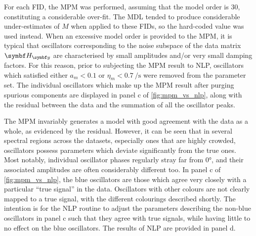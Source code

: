 For each \ac{FID}, the \ac{MPM} was performed, assuming that the model order is
30, constituting a considerable over-fit. The \ac{MDL} tended to produce
considerable under-estimates of $M$ when applied to these \acp{FID}, so the
hard-coded value was used instead. When an excessive model order is provided to
the \ac{MPM}, it is typical that oscillators corresponding to the noise
subspace of the data matrix $\Hy$ are characterised by small amplitudes and/or
very small damping factors. For this reason, prior to subjecting the \ac{MPM}
result to \ac{NLP}, oscillators which satisfied either $a_m < 0.1$ or  $\eta_m
< \qty{0.7}{\per\second}$ were removed from the parameter set. The individual
oscillators which make up the \ac{MPM} result after purging spurious components
are displayed in panel c of \cref{fig:mpm_vs_nlp}, along with the residual
between the data and the summation of all the oscillator peaks.

The \ac{MPM} invariably generates a model with good agreement with the data as
a whole, as evidenced by the residual.
However, it can be seen that in several spectral regions across the datasets,
especially ones that are highly crowded, oscillators possess parameters which
deviate significantly from the true ones.
Most notably, individual oscillator phases regularly stray far from \ang{0},
and their associated amplitudes are often considerably different too.
In panel c of \cref{fig:mpm_vs_nlp}, the blue oscillators are those which
agree very closely with a particular ``true signal'' in the data.
Oscillators with other colours are not clearly mapped to a true signal,
with the different colourings described shortly.
The intention is for the \ac{NLP} routine to adjust the parameters describing
the non-blue oscillators in panel c such that they agree with true signals,
while having little to no effect on the blue oscillators. The results of
\ac{NLP} are provided in panel d.

